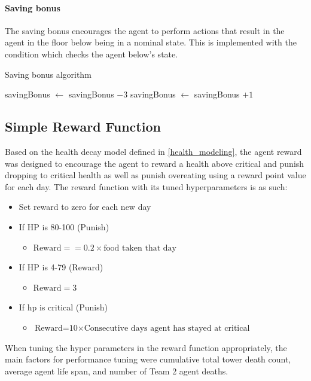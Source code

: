\paragraph{Saving bonus}
The saving bonus encourages the agent to perform actions that result in the agent in the floor below being in a nominal state. This is implemented with the condition which checks the agent below's state.

\begin{algorithm}[H]
\caption{Saving bonus algorithm}
\label{savingbonus-algorithm}
 {
savingBonus $\gets$ savingBonus $-3$\;
}{
savingBonus $\gets$ savingBonus $+1$\;
}
\end{algorithm}

\subsection{Simple Reward Function}

Based on the health decay model defined in \ref{health_modeling}, the agent reward was designed to encourage the agent to reward a health above critical and punish dropping to critical health as well as punish overeating using a reward point value for each day. The reward function with its tuned hyperparameters is as such:
\begin{itemize}
    \item Set reward to zero for each new day
    \item If HP is 80-100 (Punish)
    \begin{itemize}
        \item $\textrm{Reward} = =0.2\times\textrm{food taken that day}$
    \end{itemize}
    \item If HP is 4-79 (Reward)
    \begin{itemize}
        \item $\textrm{Reward} = 3$
    \end{itemize}
    \item If hp is critical (Punish)
    \begin{itemize}
        \item $\textrm{Reward=10}\times\textrm{Consecutive days agent has stayed at critical}$
    \end{itemize}
\end{itemize}

When tuning the hyper parameters in the reward function appropriately, the main factors for performance tuning were cumulative total tower death count, average agent life span, and number of Team 2 agent deaths. 

